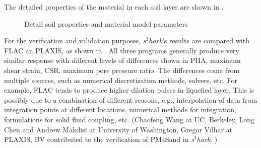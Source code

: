 The detailed properties of the material in each soil layer are shown in .

\begin{figure}[!htbp]
  \centering 
    
  \caption{Detail soil properties and material model parameters}
  \label{fig:s3hark6}
\end{figure}

For the verification and validation purposes, \textit{s$^3$hark}'s results are compared with FLAC an PLAXIS, as shown in . 
All three programs generally produce very similar response with
different levels of differences shown in PHA, maximum shear strain, CSR, maximum pore pressure ratio. 
The differences come from multiple sources, such as numerical discretization methods, solvers, etc.
For example, FLAC tends to produce higher dilation pulses in liquefied layer. 
This is possibly due to a combination of different reasons, e.g.,
interpolation of data from integration points at different
locations, numerical methods for integration, formulations for
solid fluid coupling, etc.
(Chaofeng Wang at UC, Berkeley, Long Chen and Andrew Makdisi at University of Washington,  
Gregor Vilhar at PLAXIS, BV contributed to the verification of PM4Sand in \textit{s$^3$hark}. )

